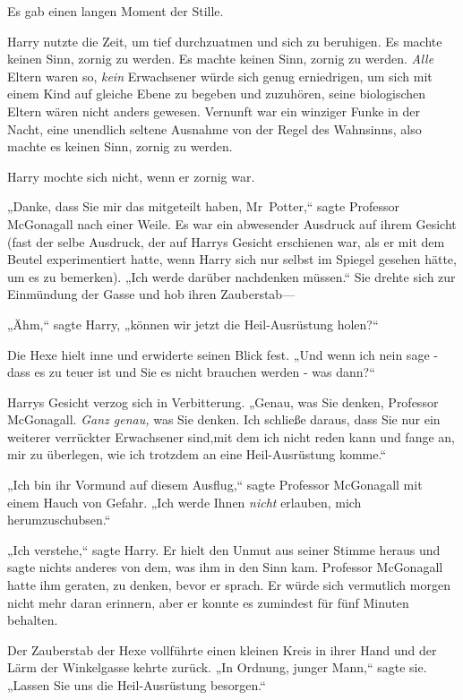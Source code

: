 {Es gab einen langen Moment der Stille.

Harry nutzte die Zeit, um tief durchzuatmen und sich zu beruhigen. Es machte keinen Sinn, zornig zu werden. Es machte keinen Sinn, zornig zu werden. \emph{Alle} Eltern waren so, \emph{kein} Erwachsener würde sich genug erniedrigen, um sich mit einem Kind auf gleiche Ebene zu begeben und zuzuhören, seine biologischen Eltern wären nicht anders gewesen. Vernunft war ein winziger Funke in der Nacht, eine unendlich seltene Ausnahme von der Regel des Wahnsinns, also machte es keinen Sinn, zornig zu werden.

Harry mochte sich nicht, wenn er zornig war.

„Danke, dass Sie mir das mitgeteilt haben, Mr~Potter,“ sagte Professor McGonagall nach einer Weile. Es war ein abwesender Ausdruck auf ihrem Gesicht (fast der selbe Ausdruck, der auf Harrys Gesicht erschienen war, als er mit dem Beutel experimentiert hatte, wenn Harry sich nur selbst im Spiegel gesehen hätte, um es zu bemerken). „Ich werde darüber nachdenken müssen.“ Sie drehte sich zur Einmündung der Gasse und hob ihren Zauberstab—

„Ähm,“ sagte Harry, „können wir jetzt die Heil-Ausrüstung holen?“

Die Hexe hielt inne und erwiderte seinen Blick fest. „Und wenn ich nein sage - dass es zu teuer ist und Sie es nicht brauchen werden - was dann?“

Harrys Gesicht verzog sich in Verbitterung. „Genau, was Sie denken, Professor McGonagall. \emph{Ganz genau,} was Sie denken. Ich schließe daraus, dass Sie nur ein weiterer verrückter Erwachsener sind,mit dem ich nicht reden kann und fange an, mir zu überlegen, wie ich trotzdem an eine Heil-Ausrüstung komme.“

„Ich bin ihr Vormund auf diesem Ausflug,“ sagte Professor McGonagall mit einem Hauch von Gefahr. „Ich werde Ihnen \emph{nicht} erlauben, mich herumzuschubsen.“

„Ich verstehe,“ sagte Harry. Er hielt den Unmut aus seiner Stimme heraus und sagte nichts anderes von dem, was ihm in den Sinn kam. Professor McGonagall hatte ihm geraten, zu denken, bevor er sprach. Er würde sich vermutlich morgen nicht mehr daran erinnern, aber er konnte es zumindest für fünf Minuten behalten.

Der Zauberstab der Hexe vollführte einen kleinen Kreis in ihrer Hand und der Lärm der Winkelgasse kehrte zurück. „In Ordnung, junger Mann,“ sagte sie. „Lassen Sie uns die Heil-Ausrüstung besorgen.“

}
